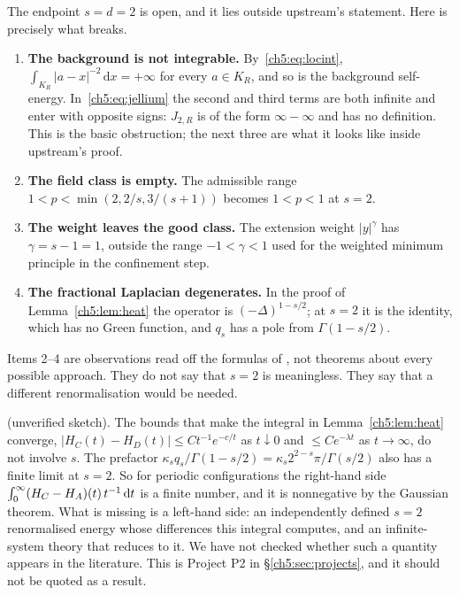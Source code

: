 The endpoint $s=d=2$ is open, and it lies outside upstream's statement. Here is precisely what breaks.
\begin{enumerate}[leftmargin=*]
\item \textbf{The background is not integrable.} By~\eqref{ch5:eq:locint}, $\int_{K_R}|a-x|^{-2}\,\mathrm{d}x=+\infty$ for
  every $a\in K_R$, and so is the background self-energy. In~\eqref{ch5:eq:jellium} the second and third terms are both
  infinite and enter with opposite signs: $J_{2,R}$ is of the form $\infty-\infty$ and has no definition. This is the
  basic obstruction; the next three are what it looks like inside upstream's proof.
\item \textbf{The field class is empty.} The admissible range $1<p<\min(2,2/s,3/(s+1))$ becomes $1<p<1$ at $s=2$.
\item \textbf{The weight leaves the good class.} The extension weight $|y|^{\gamma}$ has $\gamma=s-1=1$, outside the
  range $-1<\gamma<1$ used for the weighted minimum principle in the confinement step.
\item \textbf{The fractional Laplacian degenerates.} In the proof of Lemma~\ref{ch5:lem:heat} the operator is
  $(-\Delta)^{1-s/2}$; at $s=2$ it is the identity, which has no Green function, and $q_s$ has a pole from
  $\Gamma(1-s/2)$.
\end{enumerate}
Items 2--4 are \tierC{} observations read off the formulas of \cite[\S8]{oai}, not theorems about every possible
approach. They do not say that $s=2$ is meaningless. They say that a different renormalisation would be needed.

\begin{remark}[a possible periodic quantity at $s=2$]\label{ch5:rem:s2}
\tierC{} (unverified sketch). The bounds that make the integral in Lemma~\ref{ch5:lem:heat} converge,
$|H_C(t)-H_D(t)|\le Ct^{-1}e^{-c/t}$ as $t\downarrow0$ and $\le Ce^{-\lambda t}$ as $t\to\infty$, do not involve $s$.
The prefactor $\kappa_sq_s/\Gamma(1-s/2)=\kappa_s2^{2-s}\pi/\Gamma(s/2)$ also has a finite limit at $s=2$. So for
periodic configurations the right-hand side
$\int_0^\infty(H_C-H_A)(t)\,t^{-1}\,\mathrm{d}t$ is a finite number, and it is nonnegative by the Gaussian theorem.
What is missing is a left-hand side: an independently defined $s=2$ renormalised energy whose differences this
integral computes, and an infinite-system theory that reduces to it. We have not checked whether such a quantity
appears in the literature. This is Project P2 in \S\ref{ch5:sec:projects}, and it should not be quoted as a result.
\end{remark}

